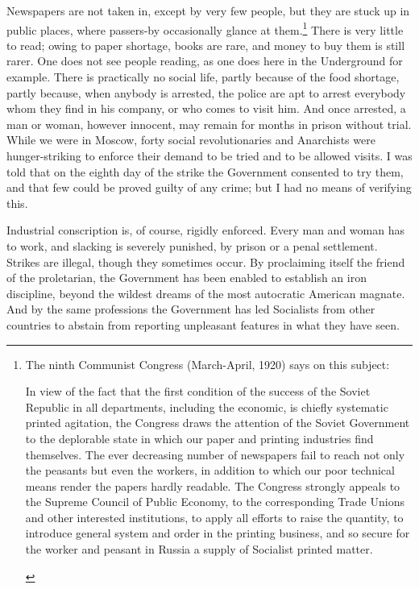 Newspapers are not taken in, except by very few people, but they are stuck up in public places, where passers-by occasionally glance at them.\footnote{The ninth Communist Congress (March-April, 1920) says on this subject: 
\begin{displayquote}
In view of the fact that the first condition of the success of the Soviet Republic in all departments, including the economic, is chiefly systematic printed agitation, the Congress draws the attention of the Soviet Government to the deplorable state in which our paper and printing industries find themselves. The ever decreasing number of newspapers fail to reach not only the peasants but even the workers, in addition to which our poor technical means render the papers hardly readable. The Congress strongly appeals to the Supreme Council of Public Economy, to the corresponding Trade Unions and other interested institutions, to apply all efforts to raise the quantity, to introduce general system and order in the printing business, and so secure for the worker and peasant in Russia a supply of Socialist printed matter. \end{displayquote}} There is very little to read; owing to paper shortage, books are rare, and money to buy them is still rarer. One does not see people reading, as one does here in the Underground for example. There is practically no social life, partly because of the food shortage, partly because, when anybody is arrested, the police are apt to arrest everybody whom they find in his company, or who comes to visit him. And once arrested, a man or woman, however innocent, may remain for months in prison without trial. While we were in Moscow, forty social revolutionaries and Anarchists were hunger-striking to enforce their demand to be tried and to be allowed visits. I was told that on the eighth day of the strike the Government consented to try them, and that few could be proved guilty of any crime; but I had no means of verifying this.

Industrial conscription is, of course, rigidly enforced. Every man and woman has to work, and slacking is severely punished, by prison or a penal settlement. Strikes are illegal, though they sometimes occur. By proclaiming itself the friend of the proletarian, the Government has been enabled to establish an iron discipline, beyond the wildest dreams of the most autocratic American magnate. And by the same professions the Government has led Socialists from other countries to abstain from reporting unpleasant features in what they have seen.

